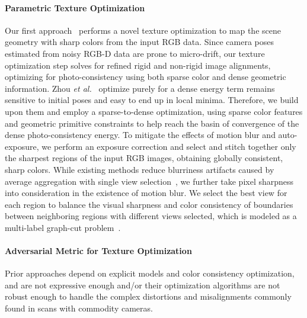 \paragraph*{Parametric Texture Optimization}
Our first approach~\cite{huang20173dlite} performs a novel texture optimization to map the scene geometry with sharp colors from the input RGB data.
Since camera poses estimated from noisy RGB-D data are prone to micro-drift, our texture optimization step solves for refined rigid and non-rigid image alignments, optimizing for photo-consistency using both sparse color and dense geometric information.
%
Zhou \textit{et al.}~\cite{zhou2014color} optimize purely for a dense energy term remains sensitive to initial poses and easy to end up in local minima. Therefore, we build upon them and employ a sparse-to-dense optimization, using sparse color features and geometric primitive constraints to help reach the basin of convergence of the dense photo-consistency energy.
%
To mitigate the effects of motion blur and auto-exposure, we perform an exposure correction and select and stitch together only the sharpest regions of the input RGB images, obtaining globally consistent, sharp colors. While existing methods reduce blurriness artifacts caused by average aggregation with single view selection~\cite{dessein2014seamless}, we further take pixel sharpness into consideration in the existence of motion blur. We select the best view for each region to balance the visual sharpness and color consistency of boundaries between neighboring regions with different views selected, which is modeled as a multi-label graph-cut problem~\cite{boykov2001fast}.

\paragraph*{Adversarial Metric for Texture Optimization}
Prior approaches depend on explicit models and color consistency optimization, and are not expressive enough and/or their optimization algorithms are not robust enough to handle the complex distortions and misalignments commonly found in scans with commodity cameras.

